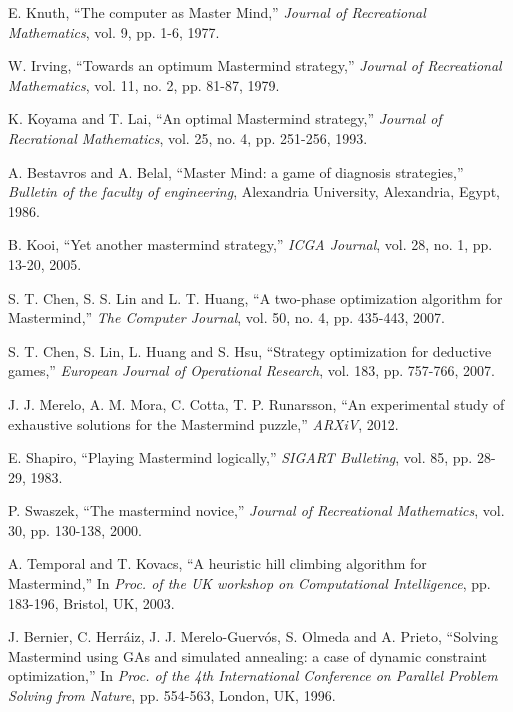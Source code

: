 \begin{thebibliography}{1}

E. Knuth, ``The computer as Master Mind,'' {\em Journal of Recreational Mathematics}, vol. 9, pp. 1-6, 1977.

W. Irving, ``Towards an optimum Mastermind strategy,'' {\em Journal of Recreational Mathematics}, vol. 11, no. 2, pp. 81-87, 1979.

K. Koyama and T. Lai, ``An optimal Mastermind strategy,'' {\em Journal of Recrational Mathematics}, vol. 25, no. 4, pp. 251-256, 1993.

A. Bestavros and A. Belal, ``Master Mind: a game of diagnosis strategies,'' {\em Bulletin of the faculty of engineering}, Alexandria University, Alexandria, Egypt, 1986.

B. Kooi, ``Yet another mastermind strategy,'' {\em ICGA Journal}, vol. 28, no. 1, pp. 13-20, 2005.

S. T. Chen, S. S. Lin and L. T. Huang, ``A two-phase optimization algorithm for Mastermind,'' {\em The Computer Journal}, vol. 50, no. 4, pp. 435-443, 2007.

S. T. Chen, S. Lin, L. Huang and S. Hsu, ``Strategy optimization for deductive games,'' {\em European Journal of Operational Research}, vol. 183, pp. 757-766, 2007.

J. J. Merelo, A. M. Mora, C. Cotta, T. P. Runarsson,
``An experimental study of exhaustive solutions for the Mastermind puzzle,''
{\em ARXiV}, 2012.

E. Shapiro, ``Playing Mastermind logically,'' {\em SIGART Bulleting}, vol. 85, pp. 28-29, 1983.

P. Swaszek, ``The mastermind novice,'' {\em Journal of Recreational Mathematics}, vol. 30, pp. 130-138, 2000.

A. Temporal and T. Kovacs, ``A heuristic hill climbing algorithm for Mastermind,'' In {\em Proc. of the UK workshop on Computational Intelligence}, pp. 183-196, Bristol, UK, 2003.

J. Bernier, C. Herr\'aiz, J. J. Merelo-Guerv\'os, S. Olmeda and A. Prieto, ``Solving Mastermind using GAs and simulated annealing: a case of dynamic constraint optimization,'' In {\em Proc. of the 4th International Conference on Parallel Problem Solving from Nature}, pp. 554-563, London, UK, 1996.


\end{thebibliography}
